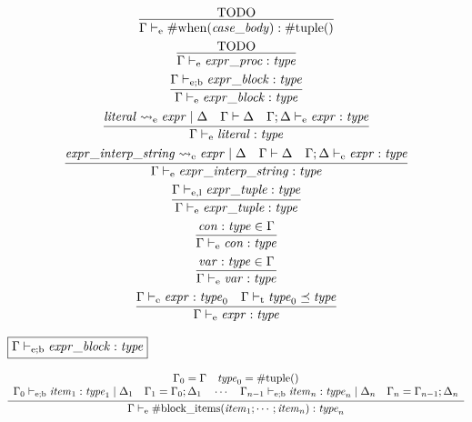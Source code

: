 \begin{gather*}
    \infer{\Gamma \vdash_\mathrm{e} \mathrm{\#when}(\mathit{case\_body}): \mathrm{\#tuple}()}{
        \text{TODO}
    }
    \\
    \infer{\Gamma \vdash_\mathrm{e} \mathit{expr\_proc}: \mathit{type}}{
        \text{TODO}
    }
    \\
    \infer{\Gamma \vdash_\mathrm{e} \mathit{expr\_block}: \mathit{type}}{
        \Gamma \vdash_{\mathrm{e}; \mathrm{b}} \mathit{expr\_block}: \mathit{type}
    }
    \\
    \infer{\Gamma \vdash_\mathrm{e} \mathit{literal}: \mathit{type}}{
        \mathit{literal} \rightsquigarrow_\mathrm{e} \mathit{expr} \mid \Delta
        &
        \Gamma \vdash \Delta
        &
        \Gamma; \Delta \vdash_\mathrm{e} \mathit{expr}: \mathit{type}
    }
    \\
    \infer{\Gamma \vdash_\mathrm{e} \mathit{expr\_interp\_string}: \mathit{type}}{
        \mathit{expr\_interp\_string} \rightsquigarrow_\mathrm{e} \mathit{expr} \mid \Delta
        &
        \Gamma \vdash \Delta
        &
        \Gamma; \Delta \vdash_\mathrm{e} \mathit{expr}: \mathit{type}
    }
    \\
    \infer{\Gamma \vdash_\mathrm{e} \mathit{expr\_tuple}: \mathit{type}}{
        \Gamma \vdash_{\mathrm{e}, \mathrm{l}} \mathit{expr\_tuple}: \mathit{type}
    }
    \\
    \infer{\Gamma \vdash_\mathrm{e} \mathit{con}: \mathit{type}}{
        \mathit{con}: \mathit{type} \in \Gamma
    }
    \\
    \infer{\Gamma \vdash_\mathrm{e} \mathit{var}: \mathit{type}}{
        \mathit{var}: \mathit{type} \in \Gamma
    }
    \\
    \infer{\Gamma \vdash_\mathrm{e} \mathit{expr}: \mathit{type}}{
        \Gamma \vdash_\mathrm{e} \mathit{expr}: \mathit{type}_0
        &
        \Gamma \vdash_\mathrm{t} \mathit{type}_0 \preceq \mathit{type}
    }
\end{gather*}

$\fbox{$\Gamma \vdash_{\mathrm{e}; \mathrm{b}} \mathit{expr\_block}: \mathit{type}$}$

\begin{gather*}
    \infer{\Gamma \vdash_\mathrm{e} \mathrm{\#block\_items}(\mathit{item}_1; \cdots; \mathit{item}_n): \mathit{type}_n}{
        \begin{array}{c}
            \Gamma_0 = \Gamma
            \hspace{1em}
            \mathit{type}_0 = \mathrm{\#tuple}()
            \\
            \Gamma_0 \vdash_{\mathrm{e}; \mathrm{b}} \mathit{item}_1: \mathit{type}_1 \mid \Delta_1
            \hspace{1em}
            \Gamma_1 = \Gamma_0; \Delta_1
            \hspace{1em}
            \cdots
            \hspace{1em}
            \Gamma_{n - 1} \vdash_{\mathrm{e}; \mathrm{b}} \mathit{item}_n: \mathit{type}_n \mid \Delta_n
            \hspace{1em}
            \Gamma_n = \Gamma_{n - 1}; \Delta_n
        \end{array}
    }
\end{gather*}

